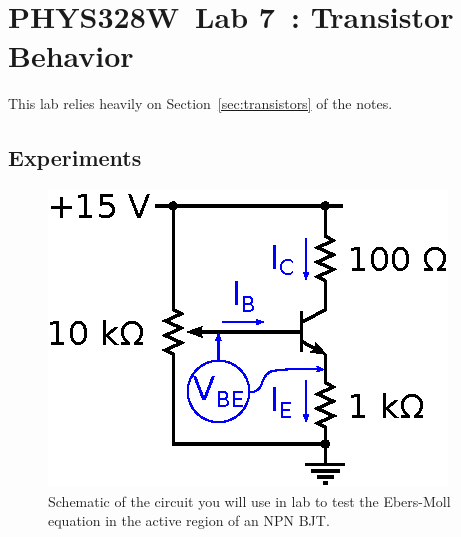\documentclass[11pt]{article}
\newcommand{\COURSE}{PHYS328W}
\newcommand{\LABNUM}{7}
\newcommand{\TITLE}{Transistor Behavior}
\begin{document}
\thispagestyle{empty}

\section*{\COURSE\ Lab \LABNUM\ : \TITLE}

This lab relies heavily on Section~\ref{sec:transistors} of the notes.

\subsection*{Experiments}

\begin{figure}[ht]
  \begin{center}
    \includegraphics{ebersmollcircuit.eps}
    \caption{Schematic of the circuit you will use in lab to
      test the Ebers-Moll equation in the active region of an NPN
      BJT.}
    \label{fig:ebersmollcircuit}
  \end{center}
\end{figure}
\end{document}
